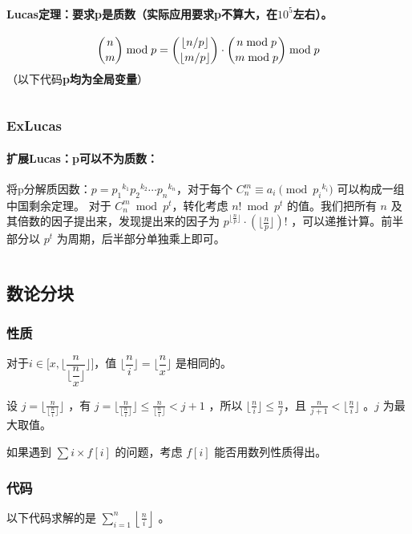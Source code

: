 \documentclass[a4paper,11pt]{article}
\begin{document}
\paragraph{\texorpdfstring{Lucas定理：要求\textbf{p是质数}（实际应用要求p不算大，在\({10}^5\)左右）。}{Lucas定理：要求p是质数（实际应用要求p不算大，在\{10\}\^{}5左右）。}}
\[\dbinom{n}{m}\bmod p=\dbinom{\lfloor n/p\rfloor}{\lfloor m/p\rfloor}\cdot\dbinom{n\bmod p}{m\bmod p}\bmod p\]
（以下代码\textbf{p均为全局变量}）
\inputminted[linenos]{c++}{math/lucas.cpp}
\subsubsection{ExLucas}
\paragraph{\texorpdfstring{扩展Lucas：\textbf{p可以不为质数：}}{扩展Lucas：p可以不为质数：}}
将p分解质因数：\(p={p_1}^{k_1}{p_2}^{k_2}\cdots{p_n}^{k_n}\)，对于每个
\(C_n^m\equiv a_i \pmod {{p_i}^{k_i}}\) 可以构成一组中国剩余定理。
对于 \(C_n^m\bmod p^t\)，转化考虑 \(n!\bmod p^t\) 的值。我们把所有 \(n\)
及其倍数的因子提出来，发现提出来的因子为
\(p^{\lfloor \frac{n}{p}\rfloor}\cdot(\lfloor \frac{n}{p}\rfloor)! \)
，可以递推计算。前半部分以 \(p^t\) 为周期，后半部分单独乘上即可。
\inputminted[linenos,breaklines]{c++}{math/exlucas.cpp}

\subsection{数论分块}
\subsubsection{性质}
对于\(i \in \Big[x,\lfloor\dfrac{n}{\lfloor\dfrac{n}{x}\rfloor}\rfloor\Big]\)，值
\(\lfloor\dfrac{n}{i}\rfloor = \lfloor\dfrac{n}{x}\rfloor\) 是相同的。

设 \(j=\lfloor\frac{n}{\lfloor\frac{n}{i}\rfloor}\rfloor\) ，有
\(j=\lfloor\frac{n}{\lfloor\frac{n}{i}\rfloor}\rfloor\le \frac{n}{\lfloor\frac{n}{i}\rfloor}<j+1\)
，所以 \(\lfloor\frac{n}{i}\rfloor\le \frac{n}{j}\)，且
\(\frac{n}{j+1}<\lfloor\frac{n}{i}\rfloor\) 。\(j\) 为最大取值。

如果遇到 \(\sum i\times f[i]\) 的问题，考虑 \(f[i]\)
能否用数列性质得出。
\subsubsection{代码}
以下代码求解的是 \(\sum\limits_{i=1}^{n}{\left\lfloor \frac{n}{i}\right\rfloor}\) 。
\inputminted[linenos,breaklines]{c++}{math/fenkuai.cpp}
\end{document}
